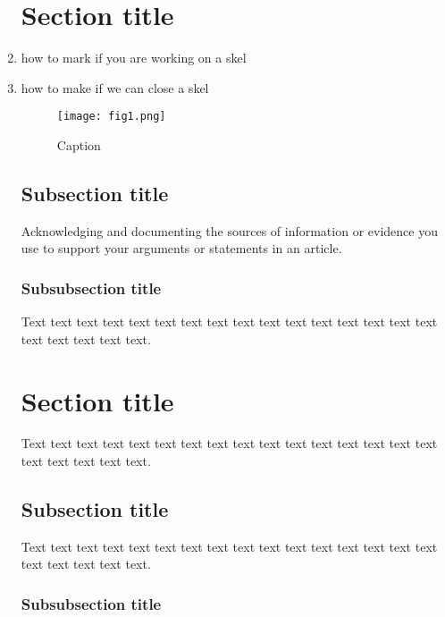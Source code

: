 \documentclass{iucrjournals}
\begin{document}
\begin{enumerate}
\section{Section title}
\item \doing how to mark if you are working on a skel
\item \done how to make if we can close a skel

\begin{figure}[ht] %
\label{fig:figure1}
\begin{center}
\texttt{[image: fig1.png]} %
\end{center}
\caption{Caption \protect\cite{knuth84}} %
\end{figure}

\subsection{Subsection title}

Acknowledging and documenting the sources of information or evidence you use to support your arguments or statements in an article\cite{billinge_problem_2007,keen_total_2020}.

\subsubsection{Subsubsection title}

Text text text text text text text text text text text text text text
text text text text text text text.



\section{Section title}

Text text text text text text text text text text text text text text
text text text text text text text.

\subsection{Subsection title}

Text text text text text text text text text text text text text text
text text text text text text text.

\subsubsection{Subsubsection title}


\end{enumerate}
\end{document}
